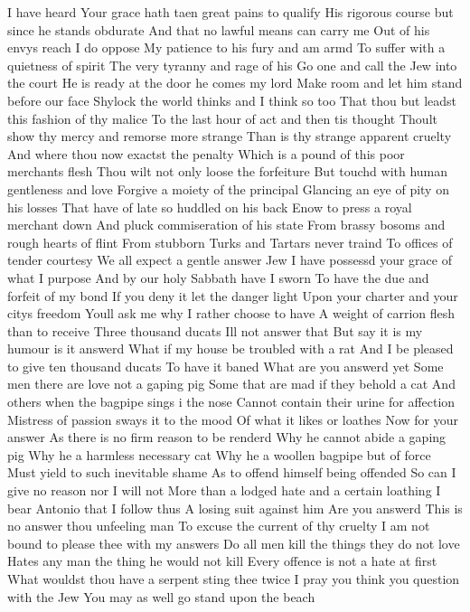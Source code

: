 I have heard
Your grace hath taen great pains to qualify
His rigorous course but since he stands obdurate
And that no lawful means can carry me
Out of his envys reach I do oppose
My patience to his fury and am armd
To suffer with a quietness of spirit
The very tyranny and rage of his
Go one and call the Jew into the court
He is ready at the door he comes my lord
Make room and let him stand before our face
Shylock the world thinks and I think so too
That thou but leadst this fashion of thy malice
To the last hour of act and then tis thought
Thoult show thy mercy and remorse more strange
Than is thy strange apparent cruelty
And where thou now exactst the penalty
Which is a pound of this poor merchants flesh
Thou wilt not only loose the forfeiture
But touchd with human gentleness and love
Forgive a moiety of the principal
Glancing an eye of pity on his losses
That have of late so huddled on his back
Enow to press a royal merchant down
And pluck commiseration of his state
From brassy bosoms and rough hearts of flint
From stubborn Turks and Tartars never traind
To offices of tender courtesy
We all expect a gentle answer Jew
I have possessd your grace of what I purpose
And by our holy Sabbath have I sworn
To have the due and forfeit of my bond
If you deny it let the danger light
Upon your charter and your citys freedom
Youll ask me why I rather choose to have
A weight of carrion flesh than to receive
Three thousand ducats Ill not answer that
But say it is my humour is it answerd
What if my house be troubled with a rat
And I be pleased to give ten thousand ducats
To have it baned What are you answerd yet
Some men there are love not a gaping pig
Some that are mad if they behold a cat
And others when the bagpipe sings i the nose
Cannot contain their urine for affection
Mistress of passion sways it to the mood
Of what it likes or loathes Now for your answer
As there is no firm reason to be renderd
Why he cannot abide a gaping pig
Why he a harmless necessary cat
Why he a woollen bagpipe but of force
Must yield to such inevitable shame
As to offend himself being offended
So can I give no reason nor I will not
More than a lodged hate and a certain loathing
I bear Antonio that I follow thus
A losing suit against him Are you answerd
This is no answer thou unfeeling man
To excuse the current of thy cruelty
I am not bound to please thee with my answers
Do all men kill the things they do not love
Hates any man the thing he would not kill
Every offence is not a hate at first
What wouldst thou have a serpent sting thee twice
I pray you think you question with the Jew
You may as well go stand upon the beach
